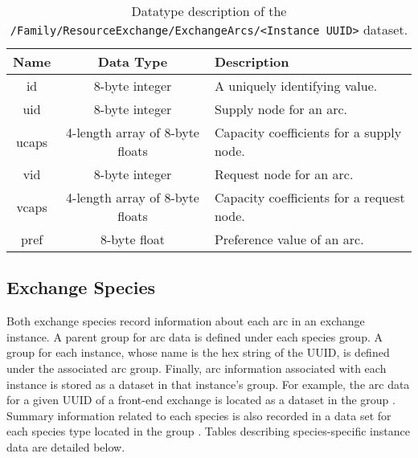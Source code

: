 \begin{table}[h!]
\centering
\label{tbl:/Family/ResourceExchange/ExchangeArcs/id_8017b48888ac424fb991527195a831b6}
\caption{Datatype description of the \lstinline[basicstyle=\ttfamily\color{black}]|/Family/ResourceExchange/ExchangeArcs/<Instance UUID>| dataset.}
\begin{tabularx}{\columnwidth-10pt}{|c|c|X|} %
\hline
\textbf{Name} & \textbf{Data Type} & \textbf{Description}       \\ \hline
id & 8-byte integer & A uniquely identifying value. \\ \hline
uid & 8-byte integer & Supply node for an arc. \\ \hline
ucaps & 4-length array of 8-byte floats & Capacity coefficients for a supply node. \\ \hline
vid & 8-byte integer & Request node for an arc. \\ \hline
vcaps & 4-length array of 8-byte floats & Capacity coefficients for a request node. \\ \hline
pref & 8-byte float & Preference value of an arc. \\ \hline
\end{tabularx}
\end{table}

\subsection{Exchange Species}

Both exchange species record information about each arc in an exchange
instance. A parent group for arc data is defined under each species group. A
group for each instance, whose name is the hex string of the UUID, is defined
under the associated arc group. Finally, arc information associated with each
instance is stored as a dataset in that instance's group. For example, the arc
data for a given UUID of a front-end exchange is located as a dataset in the
group . Summary information
related to each species is also recorded in a data set for each species type
located in the group . Tables describing
species-specific instance data are detailed below.

